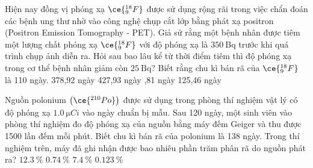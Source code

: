 \begin{ex}
	Hiện nay đồng vị phóng xạ $\ce{_9^{18}F}$ được sử dụng rộng rãi trong việc chẩn đoán các bệnh ung thư nhờ vào công nghệ chụp cắt lớp bằng phát xạ positron (Positron Emission Tomography - PET). Giả sử rằng một bệnh nhân được tiêm một lượng chất phóng xạ $\ce{_9^{18}F}$ với độ phóng xạ là $\SI{350}{\becquerel}$ trước khi quá trình chụp ảnh diễn ra. Hỏi sau bao lâu kể từ thời điểm tiêm thì độ phóng xạ trong cơ thể bệnh nhân giảm còn $\SI{25}{\becquerel}$? Biết rằng chu kì bán rã của $\ce{_9^{18}F}$ là 110 ngày.
	\choice
	{378,92 ngày}
	{427,93 ngày}
	{,81 ngày}
	{125,46 ngày}
\end{ex}
\begin{ex}
	Nguồn polonium $\left(\ce{^{210}Po}\right)$ được sử dụng trong phòng thí nghiệm vật lý có độ phóng xạ $\SI{1.0}{\micro Ci}$ vào ngày chuẩn bị mẫu. Sau 120 ngày, một sinh viên vào phòng thí nghiệm đo độ phóng xạ của nguồn bằng máy đếm Geiger và thu được 1500 lần đếm mỗi phút. Biết chu kì bán rã của polonium là 138 ngày. Trong thí nghiệm trên, máy đã ghi nhận được bao nhiêu phần trăm phân rã do nguồn phát ra?
	\choice
	{$\SI{12.3}{\percent}$}
	{$\SI{0.74}{\percent}$}
	{$\SI{7.4}{\percent}$}
	{\True $\SI{0.123}{\percent}$}
\end{ex}
